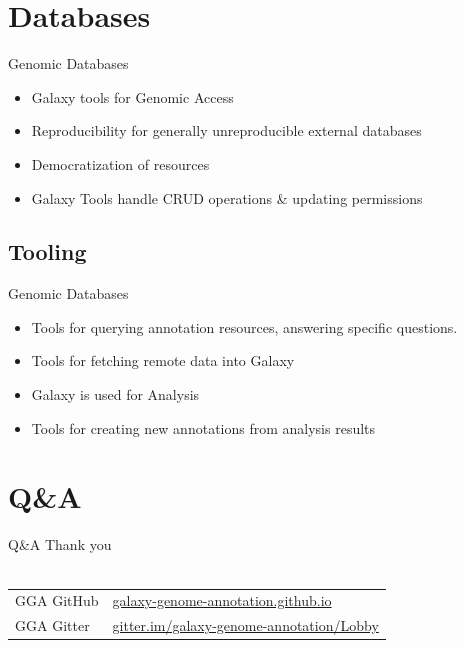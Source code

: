 \documentclass[12pt]{phage3slides} %
\begin{document}
\section{Databases}

\begin{frame}{Genomic Databases}
    \begin{itemize}
        \item Galaxy tools for Genomic Access
        \item Reproducibility for generally unreproducible external databases
        \item Democratization of resources%
        \item Galaxy Tools handle CRUD operations \& updating permissions
    \end{itemize}
\end{frame}

\subsection{Tooling}
\begin{frame}{Genomic Databases}
    \begin{itemize}
        \item Tools for querying annotation resources, answering specific questions. %
        \item Tools for fetching remote data into Galaxy
        \item Galaxy is used for Analysis
        \item Tools for creating new annotations from analysis results
    \end{itemize}
\end{frame}





\section{Q\&A}
\begin{frame}{Q\&A}
    Thank you \\\ \\
    \begin{center}
        \begin{tabular}{ll}
            \color{gray} GGA GitHub & \href{https://galaxy-genome-annotation.github.io/}{galaxy-genome-annotation.github.io}\\
            \color{gray} GGA Gitter & \href{https://gitter.im/galaxy-genome-annotation/Lobby}{gitter.im/galaxy-genome-annotation/Lobby}\\
            \end{tabular}\\[1cm]
            \fundingNSFABIannotation
    \end{center}
\end{frame}
\end{document}
